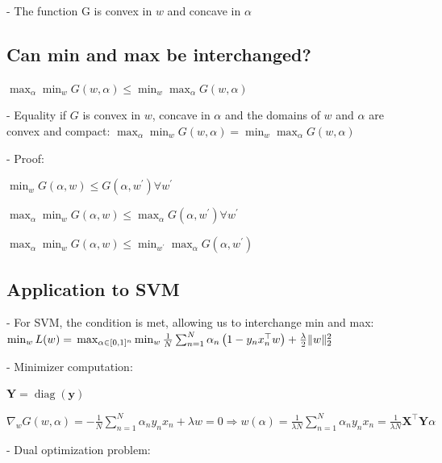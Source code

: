 - The function $\mathrm{G}$ is convex in $w$ and concave in $\alpha$

\subsection*{Can min and max be interchanged?}

$
\max _{\alpha} \min _{w} G(w, \alpha) \leq \min _{w} \max _{\alpha} G(w, \alpha)
$

- Equality if $G$ is convex in $w$, concave in $\alpha$ and the domains of $w$ and $\alpha$ are convex and compact:
$\max _{\alpha} \min _{w} G(w, \alpha) = \min _{w} \max _{\alpha} G(w, \alpha)$

- Proof:

$\min_w G(\alpha, w) \leq G\left(\alpha, w^{\prime}\right) \forall w^{\prime}$


$\max_\alpha \min_w G(\alpha, w) \leq \max_\alpha G\left(\alpha, w^{\prime}\right) \forall w^{\prime}$


$\max_\alpha \min_w G(\alpha, w) \leq \min_{w^\prime} \max_\alpha G\left(\alpha, w^{\prime}\right)$

\subsection*{Application to SVM}
- For SVM, the condition is met, allowing us to interchange min and max:
$
\min _{w} L(w)=\\\max _{\alpha \in[0,1]^{n}} \min _{w} \frac{1}{N} \sum_{n=1}^{N} \alpha_{n}\left(1-y_{n} x_{n}^{\top} w\right)+\frac{\lambda}{2}\|w\|_{2}^{2}
$

- Minimizer computation:

$
\mathbf{Y}=\operatorname{diag}(\mathbf{y})
$

$\nabla_{w} G(w, \alpha)=-\frac{1}{N} \sum_{n=1}^{N} \alpha_{n} y_{n} x_{n}+\lambda w=0 \Longrightarrow w(\alpha)=\frac{1}{\lambda N} \sum_{n=1}^{N} \alpha_{n} y_{n} x_{n}=\frac{1}{\lambda N} \mathbf{X}^{\top} \mathbf{Y} \alpha$

- Dual optimization problem:


